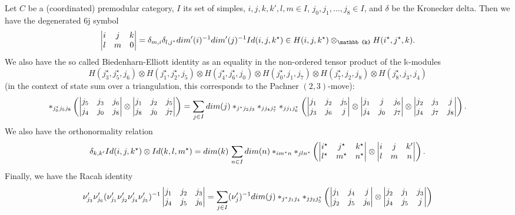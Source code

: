 \begin{proposition}\label{prop/basic-equalities-of-6j-symbols}
  Let $C$ be a (coordinated) premodular category, $I$ its set of
  simples, $i, j, k, k', l, m \in I$,
  $j_{0}, j_{1}, \ldots, j_{8} \in I$, and $\delta$ be the Kronecker
  delta. Then we have the degenerated $6$j symbol
  \begin{equation}\label{eqn/degenerated-6j}
    \normalizedSixJSymbol{i}{j}{k}{l}{m}{0} = \delta_{m,i} \delta_{l,j^{\star}}dim'(i)^{-1}dim'(j)^{-1}Id(i,j,k^{\star})
    \in H(i,j,k^{\star}) \otimes_{\mathbb{k}} H(i^{\star}, j^{\star}, k)
    .
  \end{equation}
  We also have the so called Biedenharn-Elliott identity as an
  equality in the non-ordered tensor product of the
  $\mathbb{k}$-modules
  $$
  H(j_{3}^{\star}, j_{5}^{\star}, j_{6}) \otimes
  H(j_{1}^{\star}, j_{2}^{\star}, j_{5}) \otimes
  H(j_{4}^{\star}, j_{6}^{\star}, j_{0}) \otimes
  H(j_{0}^{\star}, j_{1}, j_{7}) \otimes
  H(j_{7}^{\star}, j_{2}, j_{8}) \otimes
  H(j_{8}^{\star}, j_{3}, j_{4})
  $$
  (in the context of state sum over a triangulation, this
  corresponds to the Pachner $(2,3)$-move):
  \begin{equation}\label{eqn/Biedenharn-Elliot-identity}
    \ast_{j_{0}^{\star}j_{5}j_{8}}
    \left(
      \begin{vmatrix} j_{5} & j_{3} & j_{6} \\ j_{4} & j_{0} & j_{8} \\ \end{vmatrix} \otimes \begin{vmatrix} j_{1} & j_{2} & j_{5} \\ j_{8} & j_{0} & j_{7} \\ \end{vmatrix}
    \right)
    =
    \sum_{j \in I} dim(j)
    \ast_{j^{\star}j_{2}j_{3}}\ast_{jj_{4}j_{7}^{\star}}\ast_{jj_{1}j_{6}^{\star}}
    \left(
      \begin{vmatrix} j_{1} & j_{2} & j_{5} \\ j_{3} & j_{6} & j \\ \end{vmatrix} \otimes
      \begin{vmatrix} j_{1} & j & j_{6} \\ j_{4} & j_{0} & j_{7} \\ \end{vmatrix} \otimes
      \begin{vmatrix} j_{2} & j_{3} & j \\ j_{4} & j_{7} & j_{8} \\ \end{vmatrix}
    \right).
  \end{equation}
  We also have the orthonormality relation
  \begin{equation}\label{eqn/orthonormality-relation}
    \delta_{k,k'} Id(i,j,k^{\star}) \otimes Id(k,l,m^{\star})
    =
    dim(k)\,\sum_{n \in I} dim(n) \ast_{im^{\star}n} \ast_{jln^{\star}}
    \left(
      \begin{vmatrix} i^{\star} & j^{\star} & k^{\star} \\ l^{\star} & m^{\star} & n^{\star} \\ \end{vmatrix} \otimes
      \begin{vmatrix} i & j & k' \\ l & m & n \\ \end{vmatrix}
    \right).
  \end{equation}
  Finally, we have the Racah identity
  \begin{equation}\label{eqn/Racah-identity}
    \nu'_{j_{3}} \nu'_{j_{6}} (\nu'_{j_{1}} \nu'_{j_{2}} \nu'_{j_{4}} \nu'_{j_{5}})^{-1}
    \begin{vmatrix} j_{1} & j_{2} & j_{3} \\ j_{4} & j_{5} & j_{6} \\ \end{vmatrix}
    =
    \sum_{j \in I} (\nu'_{j})^{-1} dim(j) \ast_{j^{\star}j_{1}j_{4}} \ast_{jj_{2}j_{5}^{\star}}
    \left(
      \begin{vmatrix} j_{1} & j_{4} & j \\ j_{2} & j_{5} & j_{6} \\ \end{vmatrix} \otimes
      \begin{vmatrix} j_{2} & j_{1} & j_{3} \\ j_{4} & j_{5} & j \\ \end{vmatrix}
    \right)
  \end{equation}
\end{proposition}


